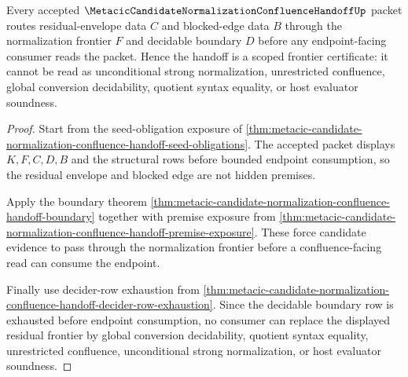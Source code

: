 \begin{theorem}
\label{thm:metacic-candidate-normalization-confluence-handoff-residual-frontier-scope}
Every accepted $\MetacicCandidateNormalizationConfluenceHandoffUp$ packet routes residual-envelope data $C$ and blocked-edge data $B$ through the normalization frontier $F$ and decidable boundary $D$ before any endpoint-facing consumer reads the packet. Hence the handoff is a scoped frontier certificate: it cannot be read as unconditional strong normalization, unrestricted confluence, global conversion decidability, quotient syntax equality, or host evaluator soundness.
\end{theorem}
\begin{proof}
Start from the seed-obligation exposure of \autoref{thm:metacic-candidate-normalization-confluence-handoff-seed-obligations}. The accepted packet displays $K,F,C,D,B$ and the structural rows before bounded endpoint consumption, so the residual envelope and blocked edge are not hidden premises.

Apply the boundary theorem \autoref{thm:metacic-candidate-normalization-confluence-handoff-boundary} together with premise exposure from \autoref{thm:metacic-candidate-normalization-confluence-handoff-premise-exposure}. These force candidate evidence to pass through the normalization frontier before a confluence-facing read can consume the endpoint.

Finally use decider-row exhaustion from \autoref{thm:metacic-candidate-normalization-confluence-handoff-decider-row-exhaustion}. Since the decidable boundary row is exhausted before endpoint consumption, no consumer can replace the displayed residual frontier by global conversion decidability, quotient syntax equality, unrestricted confluence, unconditional strong normalization, or host evaluator soundness.
\end{proof}
